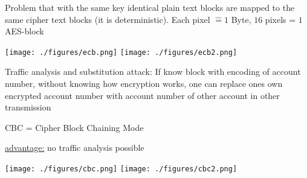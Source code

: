 \documentclass[landscape, a4paper]{article}
\begin{document}
\begin{minipage}[t]{0.198\pagewidth}
\begin{betterlist}
\begin{betterlist}
\begin{betterlist}
				\item Problem that with the same key identical plain text blocks are mapped to the same cipher text blocks (it is deterministic). Each pixel $\hat= 1$ Byte, $16$ pixels = $1$ AES-block
			\end{betterlist}
			\texttt{[image: ./figures/ecb.png]}
			\texttt{[image: ./figures/ecb2.png]}
			\begin{betterlist}
				\item \alert{Traffic analysis and substitution attack:} If know block with encoding of account number, without knowing how encryption works, one can replace ones own encrypted account number with account number of other account in other transmission
			\end{betterlist}
			\item \alert{CBC} = Cipher Block Chaining Mode
			\begin{betterlist}
				\item \underline{advantage:} no \alert{traffic analysis} possible
			\end{betterlist}

			\texttt{[image: ./figures/cbc.png]}
			\texttt{[image: ./figures/cbc2.png]}
		\end{betterlist}
	\end{betterlist}
\end{minipage}
\end{document}
